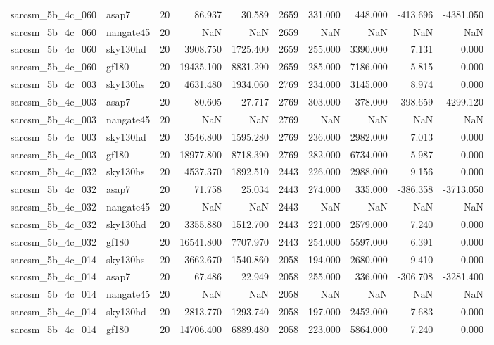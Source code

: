 \begin{tabular}{llrrrrrrrr}
sarcsm\_5b\_4c\_060 & asap7 & 20 & 86.937 & 30.589 & 2659 & 331.000 & 448.000 & -413.696 & -4381.050 \\
sarcsm\_5b\_4c\_060 & nangate45 & 20 & NaN & NaN & 2659 & NaN & NaN & NaN & NaN \\
sarcsm\_5b\_4c\_060 & sky130hd & 20 & 3908.750 & 1725.400 & 2659 & 255.000 & 3390.000 & 7.131 & 0.000 \\
sarcsm\_5b\_4c\_060 & gf180 & 20 & 19435.100 & 8831.290 & 2659 & 285.000 & 7186.000 & 5.815 & 0.000 \\
sarcsm\_5b\_4c\_003 & sky130hs & 20 & 4631.480 & 1934.060 & 2769 & 234.000 & 3145.000 & 8.974 & 0.000 \\
sarcsm\_5b\_4c\_003 & asap7 & 20 & 80.605 & 27.717 & 2769 & 303.000 & 378.000 & -398.659 & -4299.120 \\
sarcsm\_5b\_4c\_003 & nangate45 & 20 & NaN & NaN & 2769 & NaN & NaN & NaN & NaN \\
sarcsm\_5b\_4c\_003 & sky130hd & 20 & 3546.800 & 1595.280 & 2769 & 236.000 & 2982.000 & 7.013 & 0.000 \\
sarcsm\_5b\_4c\_003 & gf180 & 20 & 18977.800 & 8718.390 & 2769 & 282.000 & 6734.000 & 5.987 & 0.000 \\
sarcsm\_5b\_4c\_032 & sky130hs & 20 & 4537.370 & 1892.510 & 2443 & 226.000 & 2988.000 & 9.156 & 0.000 \\
sarcsm\_5b\_4c\_032 & asap7 & 20 & 71.758 & 25.034 & 2443 & 274.000 & 335.000 & -386.358 & -3713.050 \\
sarcsm\_5b\_4c\_032 & nangate45 & 20 & NaN & NaN & 2443 & NaN & NaN & NaN & NaN \\
sarcsm\_5b\_4c\_032 & sky130hd & 20 & 3355.880 & 1512.700 & 2443 & 221.000 & 2579.000 & 7.240 & 0.000 \\
sarcsm\_5b\_4c\_032 & gf180 & 20 & 16541.800 & 7707.970 & 2443 & 254.000 & 5597.000 & 6.391 & 0.000 \\
sarcsm\_5b\_4c\_014 & sky130hs & 20 & 3662.670 & 1540.860 & 2058 & 194.000 & 2680.000 & 9.410 & 0.000 \\
sarcsm\_5b\_4c\_014 & asap7 & 20 & 67.486 & 22.949 & 2058 & 255.000 & 336.000 & -306.708 & -3281.400 \\
sarcsm\_5b\_4c\_014 & nangate45 & 20 & NaN & NaN & 2058 & NaN & NaN & NaN & NaN \\
sarcsm\_5b\_4c\_014 & sky130hd & 20 & 2813.770 & 1293.740 & 2058 & 197.000 & 2452.000 & 7.683 & 0.000 \\
sarcsm\_5b\_4c\_014 & gf180 & 20 & 14706.400 & 6889.480 & 2058 & 223.000 & 5864.000 & 7.240 & 0.000 \\

\end{tabular}
